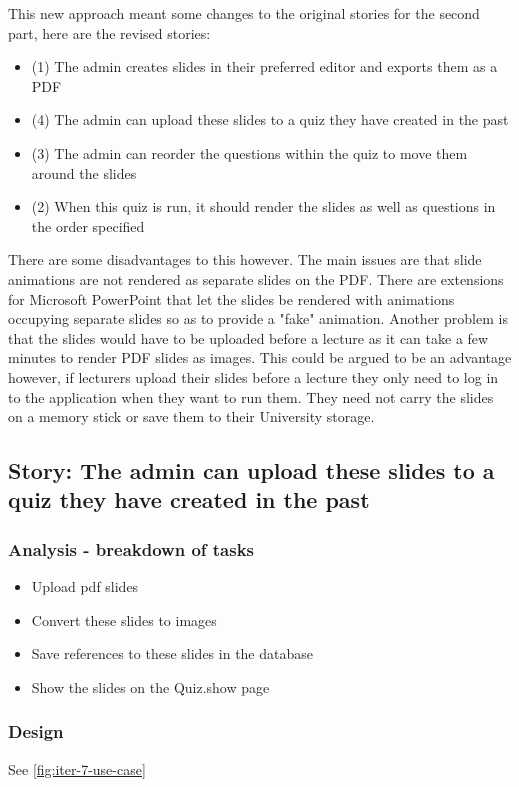 This new approach meant some changes to the original stories for the second part, here are the revised stories:
\begin{itemize}
	\item (1) The admin creates slides in their preferred editor and exports them as a PDF
	\item (4) The admin can upload these slides to a quiz they have created in the past
	\item (3) The admin can reorder the questions within the quiz to move them around the slides
	\item (2) When this quiz is run, it should render the slides as well as questions in the order specified
\end{itemize}

There are some disadvantages to this however. The main issues are that slide animations are not rendered as separate slides on the PDF. There are extensions for Microsoft PowerPoint that let the slides be rendered with animations occupying separate slides so as to provide a "fake" animation. Another problem is that the slides would have to be uploaded before a lecture as it can take a few minutes to render PDF slides as images. This could be argued to be an advantage however, if lecturers upload their slides before a lecture they only need to log in to the application when they want to run them. They need not carry the slides on a memory stick or save them to their University storage.
\newpage

\subsection{Story: The admin can upload these slides to a quiz they have created in the past}
\subsubsection{Analysis - breakdown of tasks}
\begin{itemize}
	\item Upload pdf slides
	\item Convert these slides to images
	\item Save references to these slides in the database
	\item Show the slides on the Quiz.show page
\end{itemize}
\subsubsection{Design}
See \ref{fig:iter-7-use-case}

